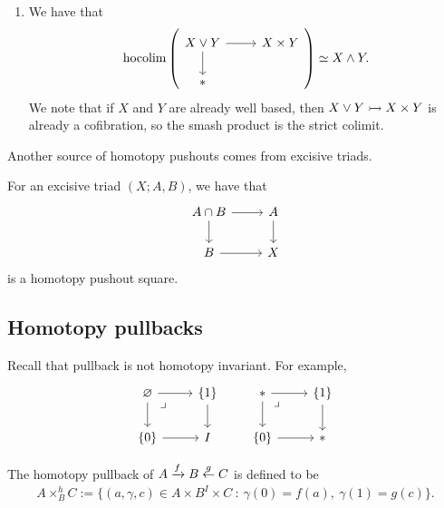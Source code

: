 \documentclass{article}[11pt]
\newcommand{\smashprod}{\wedge} %
\begin{document}
\begin{examples}
\begin{enumerate}
	\item We have that
	\begin{align*}
		\hocolim \left( \begin{tikzcd}[ampersand replacement=\&] X\vee Y\rar\dar \& X\times Y \\ \ast \end{tikzcd} \right) \simeq X \smashprod Y.
	\end{align*}
	We note that if $X$ and $Y$ are already well based, then $X\vee Y \rightarrowtail X\times Y$ is already a cofibration, so the smash product is the strict colimit.
\end{enumerate}
\end{examples}

Another source of homotopy pushouts comes from excisive triads.

\begin{theorem} For an excisive triad $(X;A,B)$, we have that
\[
	\begin{tikzcd}
	A\cap B\rar\dar & A\dar \\
	B\rar & X
	\end{tikzcd}
\]
is a homotopy pushout square.
\end{theorem}

\subsection{Homotopy pullbacks}
Recall that pullback is not homotopy invariant. For example,
\[
	\begin{tikzcd}
	\emptyset\rar\dar\pb & \{1\}\dar \\
	\{0\}\rar & I
	\end{tikzcd} \quad \quad\begin{tikzcd}
	\ast\rar\dar\pb & \{1\}\dar \\
	\{0\} \rar & \ast
	\end{tikzcd}
\]

\begin{definition} The homotopy pullback of $A\xrightarrow{f} B \overset{g}{\leftarrow} C$ is defined to be
\begin{align*}
	A\times_B^h C := \{(a,\gamma,c) \in A\times B^I \times C \ : \ \gamma(0)=f(a),\ \gamma(1) = g(c)\}.
\end{align*}
\end{definition}
\end{document}
